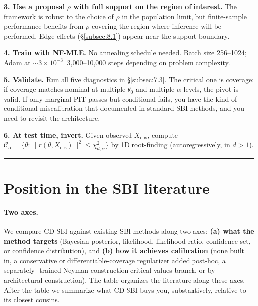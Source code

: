 \documentclass[11pt]{article}
\begin{document}
\textbf{3. Use a proposal \(\rho\) with full support on the region of
interest.} The framework is robust to the choice of \(\rho\) in the
population limit, but finite-sample performance benefits from \(\rho\)
covering the region where inference will be performed. Edge effects
(\S\ref{subsec:8.1}) appear near the support boundary.

\textbf{4. Train with NF-MLE.} No annealing schedule needed. Batch size
256--1024; Adam at \(\sim 3 \times 10^{-3}\); 3,000--10,000 steps
depending on problem complexity.

\textbf{5. Validate.} Run all five diagnostics in \S\ref{subsec:7.3}. The critical one
is coverage: if coverage matches nominal at multiple \(\theta_0\) and
multiple \(\alpha\) levels, the pivot is valid. If only marginal PIT
passes but conditional fails, you have the kind of conditional
miscalibration that \citet{HermansEtAl2022} documented in standard SBI
methods, and you need to revisit the architecture.

\textbf{6. At test time, invert.} Given observed \(X_\mathrm{obs}\),
compute
\(\mathcal{C}_\alpha = \{\theta : \|r(\theta, X_\mathrm{obs})\|^2 \le \chi^2_{d, \alpha}\}\)
by 1D root-finding (autoregressively, in \(d > 1\)).

\medskip\hrule\medskip

\section{Position in the SBI literature}\label{sec:10}

\paragraph{Two axes.}
We compare CD-SBI against existing SBI methods along two axes:
\textbf{(a) what the method targets} (Bayesian posterior, likelihood,
likelihood ratio, confidence set, or confidence distribution), and
\textbf{(b) how it achieves calibration} (none built in, a conservative
or differentiable-coverage regularizer added post-hoc, a separately-
trained Neyman-construction critical-values branch, or by
architectural construction). The table organizes the literature along
these axes. After the table we summarize what CD-SBI buys you,
substantively, relative to its closest cousins.
\end{document}
